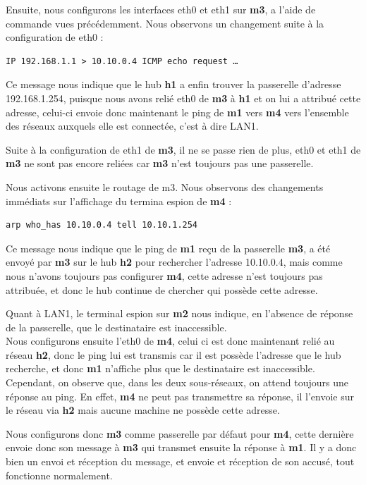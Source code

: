 \documentclass{article}
\begin{document}
Ensuite, nous configurons les interfaces eth0 et eth1 sur \textbf{m3}, a l'aide de commande vues précédemment.
Nous observons un changement suite à la configuration de eth0 :
\begin{verbatim}
IP 192.168.1.1 > 10.10.0.4 ICMP echo request … 
\end{verbatim}

Ce message nous indique que le hub \textbf{h1} a enfin trouver la passerelle d'adresse 192.168.1.254, puisque nous avons relié eth0 de \textbf{m3} à \textbf{h1} et on lui a attribué cette adresse, celui-ci envoie donc maintenant le ping de \textbf{m1} vers \textbf{m4} vers l'ensemble des réseaux auxquels elle est connectée, c'est à dire LAN1.

Suite à la configuration de eth1 de \textbf{m3}, il ne se passe rien de plus, eth0 et eth1 de \textbf{m3} ne sont pas encore reliées car \textbf{m3} n'est toujours pas une passerelle.

Nous activons ensuite le routage de m3. Nous observons des changements immédiats sur l'affichage du termina espion de \textbf{m4} :
\begin{verbatim}
arp who_has 10.10.0.4 tell 10.10.1.254
\end{verbatim}

Ce message nous indique que le ping de \textbf{m1} reçu de la passerelle \textbf{m3}, a été envoyé par \textbf{m3} sur le hub \textbf{h2} pour rechercher l'adresse 10.10.0.4, mais comme nous n'avons toujours pas configurer \textbf{m4}, cette adresse n'est toujours pas attribuée, et donc le hub continue de chercher qui possède cette adresse.

Quant à LAN1, le terminal espion sur \textbf{m2} nous indique, en l'absence de réponse de la passerelle, que le destinataire est inaccessible. \\

Nous configurons ensuite l'eth0 de \textbf{m4}, celui ci est donc maintenant relié au réseau \textbf{h2}, donc le ping lui est transmis car il est possède l'adresse que le hub recherche, et donc \textbf{m1} n'affiche plus que le destinataire est inaccessible.
	Cependant, on observe que, dans les deux sous-réseaux, on attend toujours une réponse au ping. En effet, \textbf{m4} ne peut pas transmettre sa réponse, il l'envoie sur le réseau via \textbf{h2} mais aucune machine ne possède cette adresse.

Nous configurons donc \textbf{m3} comme passerelle par défaut pour \textbf{m4}, cette dernière envoie donc son message à \textbf{m3} qui transmet ensuite la réponse à \textbf{m1}. Il y a donc bien un envoi et réception du message, et envoie et réception de son accusé, tout fonctionne normalement.
\end{document}
